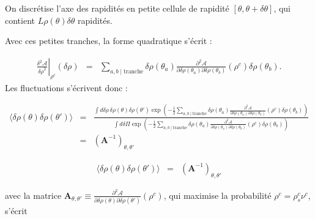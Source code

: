 {\color{\blue}
On discrétise l'axe des rapidités en  petite cellule de rapidité $[\theta, \theta+\delta\theta]$, qui contient $L\rho(\theta) \delta \theta$ rapidités. 
	



Avec ces petites tranches, la forme quadratique s’écrit :

\begin{eqnarray*}
    \left. \frac{\delta^2 \mathcal{A}}{{\delta \rho}^2} \right|_{\rho^c}(\delta \rho ) &=&  \sum_{a,b \mid \text{tranche}}  
    \delta \rho(\theta_a)  \frac{\partial^2 \mathcal{A}}{\partial \delta \rho(\theta_a) \partial \delta \rho(\theta_b) } (\rho^c)  \delta \rho(\theta_b).
\end{eqnarray*}
Les fluctuations s’écrivent donc :

\begin{eqnarray*}
    \langle \delta \rho ( \theta) \delta \rho ( \theta') \rangle &=&  
    \frac{ \int d\delta \rho \, \delta \rho(\theta) \delta \rho ( \theta') 
    \exp \left( - \frac{1}{2} \sum_{a,b \mid \text{tranche}}  
    \delta \rho(\theta_a) \frac{\partial^2 \mathcal{A}}{\partial \delta \rho(\theta_a) \partial \delta \rho(\theta_b) } (\rho^c)  \delta \rho(\theta_b) \right) }
    { \int d\delta \Pi  
    \exp \left( - \frac{1}{2} \sum_{a,b \mid \text{tranche}}  
    \delta \rho(\theta_a) \frac{\partial^2 \mathcal{A}}{\partial \delta \rho(\theta_a) \partial \delta \rho(\theta_b) } (\rho^c)  \delta \rho(\theta_b) \right) } \\
    &=& \left( \mathbf{A}^{-1} \right)_{\theta , \theta'}
\end{eqnarray*}


\begin{aff}

\begin{eqnarray*}
	\langle \delta \rho ( \theta) \delta \rho ( \theta') \rangle &=& 	\left( \mathbf{A}^{-1} \right)_{\theta , \theta'}
\end{eqnarray*}

	

avec la  matrice $\mathbf{A}_{\theta , \theta'} \equiv \frac{\partial^2 \mathcal{A}}{\partial \delta \rho(\theta) \partial \delta \rho(\theta') }(\rho^c)$, qui maximise la probabilité  $\rho^c=\rho^c_s \nu^c $, s'écrit


\end{aff}}
